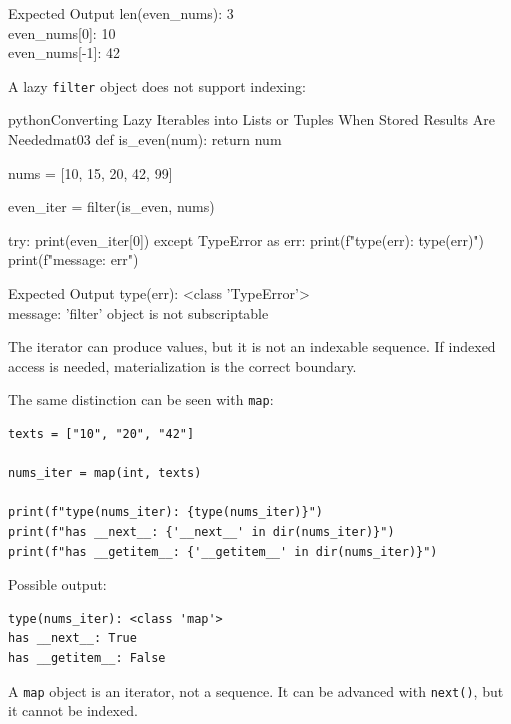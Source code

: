 \begin{iobox}{Expected Output}
len(even\_nums): 3 \\
even\_nums[0]: 10 \\
even\_nums[-1]: 42 \\
\end{iobox}




A lazy \texttt{filter} object does not support indexing:

\begin{codebox}[]{python}{Converting Lazy Iterables into Lists or Tuples When Stored Results Are Needed}{mat03}
def is_even(num):
    return num %

nums = [10, 15, 20, 42, 99]

even_iter = filter(is_even, nums)

try:
    print(even_iter[0])
except TypeError as err:
    print(f"type(err): {type(err)}")
    print(f"message: {err}")
\end{codebox}


\begin{iobox}{Expected Output}
type(err): <class 'TypeError'> \\
message: 'filter' object is not subscriptable \\
\end{iobox}




The iterator can produce values, but it is not an indexable sequence. If indexed access is needed, materialization is the correct boundary.

The same distinction can be seen with \texttt{map}:

\begin{verbatim}
texts = ["10", "20", "42"]

nums_iter = map(int, texts)

print(f"type(nums_iter): {type(nums_iter)}")
print(f"has __next__: {'__next__' in dir(nums_iter)}")
print(f"has __getitem__: {'__getitem__' in dir(nums_iter)}")
\end{verbatim}

Possible output:

\begin{verbatim}
type(nums_iter): <class 'map'>
has __next__: True
has __getitem__: False
\end{verbatim}

A \texttt{map} object is an iterator, not a sequence. It can be advanced with \texttt{next()}, but it cannot be indexed.

